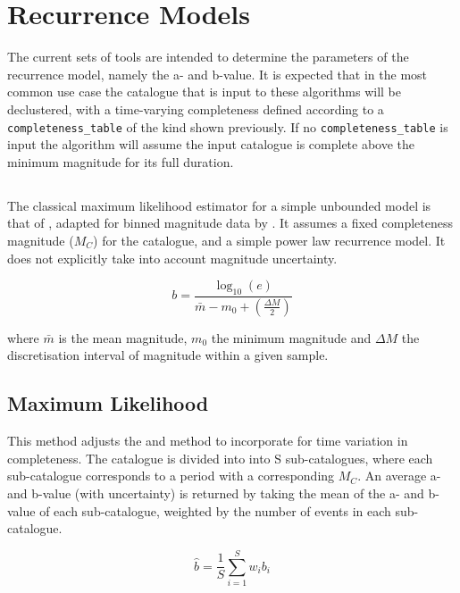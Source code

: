 \section{Recurrence Models}

The current sets of tools are intended to determine the parameters of the \cite{GutenbergRichter1944} recurrence model, namely the a- and b-value. It is expected that in the most common use case the catalogue that is input to these algorithms will be declustered, with a time-varying completeness defined according to a \verb=completeness_table= of the kind shown previously. If no \verb=completeness_table= is input the algorithm will assume the input catalogue is complete above the minimum magnitude for its full duration.

\subsection{\cite{Aki1965}}

The classical maximum likelihood estimator for a simple unbounded \cite{GutenbergRichter1944} model is that of \cite{Aki1965}, adapted for binned magnitude data by \cite{Bender1983}. It assumes a fixed completeness magnitude ($M_C$) for the catalogue, and a simple power law recurrence model. It does not explicitly take into account magnitude uncertainty.

\begin{equation}
   b = \frac{ \log_{10} \left( e \right)}{ \bar{m} - m_0 + \left( {\frac{\Delta M}{2}} \right)}
\end{equation}

\noindent where $\bar{m}$ is the mean magnitude, $m_0$ the minimum magnitude and $\Delta M$ the discretisation interval of magnitude within a given sample.

\subsection{Maximum Likelihood}

This method adjusts the \cite{Aki1965} and \cite{Bender1983} method to incorporate for time variation in completeness. The catalogue is divided into
into S sub-catalogues, where each sub-catalogue corresponds to a period 
with a corresponding $M_C$.  An average a- and b-value (with uncertainty) is returned by taking 
the mean of the a- and b-value of each sub-catalogue, weighted by 
the number of events in each sub-catalogue.

\begin{equation}
   \hat{b} = \frac{1}{S} \sum_{i = 1}^{S} w_i b_i
\end{equation}

